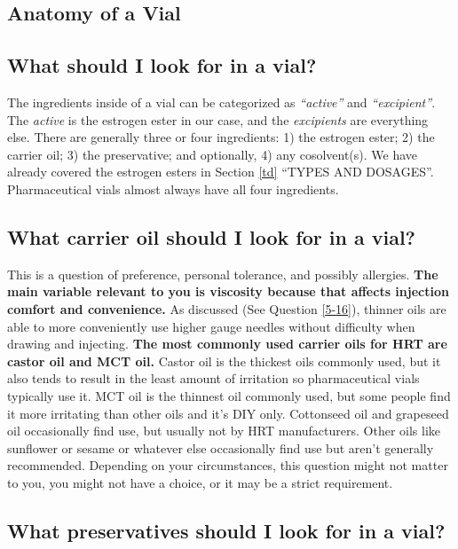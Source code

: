 \documentclass{article}
\begin{document}
{{\subsection*{Anatomy of a Vial}

\subsection{What should I look for in a vial?}

The ingredients inside of a vial can be categorized as \textit{“active”} and \textit{“excipient”}. The\textit{ active} is the estrogen ester in our case, and the \textit{excipients} are everything else. There are generally three or four ingredients: 1) the estrogen ester; 2) the carrier oil; 3) the preservative; and optionally, 4) any cosolvent(s). We have already covered the estrogen esters in Section \ref{td} “TYPES AND DOSAGES”. Pharmaceutical vials almost always have all four ingredients.

\subsection{What carrier oil should I look for in a vial?}\label{6-16}

This is a question of preference, personal tolerance, and possibly allergies. \textbf{The main variable relevant to you is viscosity because that affects injection comfort and convenience.} As discussed (See Question \ref{5-16}), thinner oils are able to more conveniently use higher gauge needles without difficulty when drawing and injecting. \textbf{The most commonly used carrier oils for HRT are castor oil and MCT oil. }Castor oil is the thickest oils commonly used, but it also tends to result in the least amount of irritation so pharmaceutical vials typically use it. MCT oil is the thinnest oil commonly used, but some people find it more irritating than other oils and it’s DIY only. Cottonseed oil and grapeseed oil occasionally find use, but usually not by HRT manufacturers. Other oils like sunflower or sesame or whatever else occasionally find use but aren’t generally recommended. Depending on your circumstances, this question might not matter to you, you might not have a choice, or it may be a strict requirement. 

\subsection{What preservatives should I look for in a vial?}\label{6-17}

}}
\end{document}
